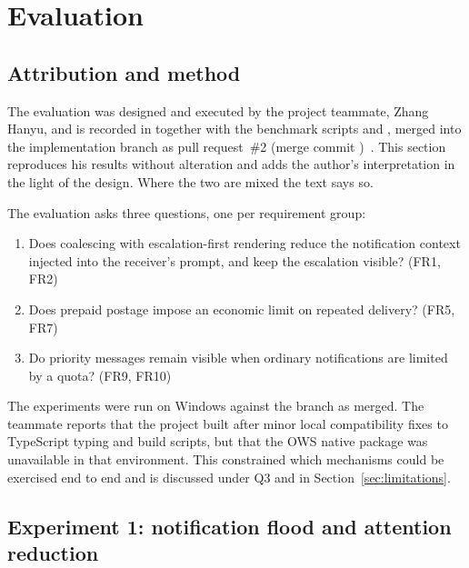\section{Evaluation}
\label{sec:evaluation}

\subsection{Attribution and method}

The evaluation was designed and executed by the project teammate, Zhang Hanyu, and is
recorded in  together with the benchmark scripts
 and , merged
into the implementation branch as pull request~\#2 (merge commit
)~\cite{tap-eval}. This section reproduces his results without alteration
and adds the author's interpretation in the light of the design. Where the two are mixed
the text says so.

The evaluation asks three questions, one per requirement group:

\begin{enumerate}[label=Q\arabic*.]
  \item Does coalescing with escalation-first rendering reduce the notification context
        injected into the receiver's prompt, and keep the escalation visible? (FR1, FR2)
  \item Does prepaid postage impose an economic limit on repeated delivery? (FR5, FR7)
  \item Do priority messages remain visible when ordinary notifications are limited by a
        quota? (FR9, FR10)
\end{enumerate}

The experiments were run on Windows against the branch as merged. The teammate reports
that the project built after minor local compatibility fixes to TypeScript typing and
build scripts, but that the OWS native package
 was unavailable in that environment. This
constrained which mechanisms could be exercised end to end and is discussed under Q3 and
in Section~\ref{sec:limitations}.

\subsection{Experiment 1: notification flood and attention reduction}
\label{sec:eval-flood}


